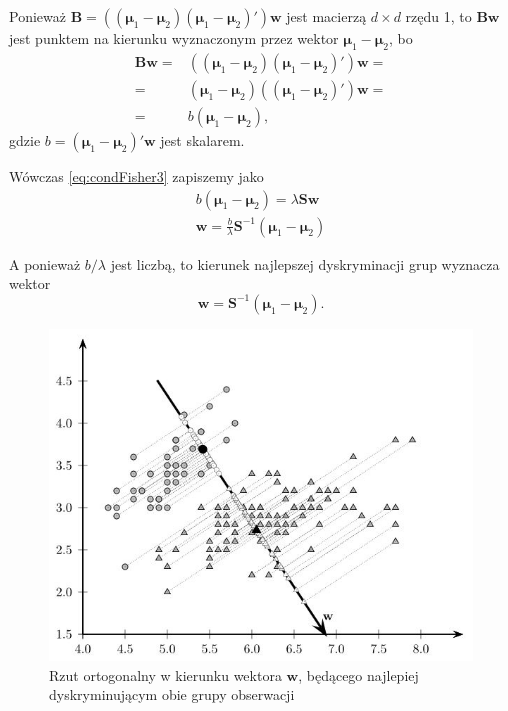 \documentclass[]{book}
\theoremstyle{plain}
\theoremstyle{definition}
\theoremstyle{definition}
\theoremstyle{definition}
\theoremstyle{definition}
\theoremstyle{remark}
\begin{document}
Ponieważ \(\boldsymbol{B}=\left((\boldsymbol{\mu}_1-\boldsymbol{\mu}_2)(\boldsymbol{\mu}_1-\boldsymbol{\mu}_2)'\right)\boldsymbol{w}\) jest macierzą \(d \times d\) rzędu 1, to \(\boldsymbol{B}\boldsymbol{w}\) jest punktem na kierunku wyznaczonym przez wektor \(\boldsymbol{\mu}_1-\boldsymbol{\mu}_2\), bo
\begin{align}
    \boldsymbol{B}\boldsymbol{w}=& \left((\boldsymbol{\mu}_1-\boldsymbol{\mu}_2)(\boldsymbol{\mu}_1-\boldsymbol{\mu}_2)'\right)\boldsymbol{w}=\\
    =&(\boldsymbol{\mu}_1-\boldsymbol{\mu}_2)\left((\boldsymbol{\mu}_1-\boldsymbol{\mu}_2)'\right)\boldsymbol{w}=\\
    =& b(\boldsymbol{\mu}_1-\boldsymbol{\mu}_2),
\end{align}
gdzie \(b = (\boldsymbol{\mu}_1-\boldsymbol{\mu}_2)'\boldsymbol{w}\) jest skalarem.

Wówczas \eqref{eq:condFisher3} zapiszemy jako
\begin{gather}
    b(\boldsymbol{\mu}_1-\boldsymbol{\mu}_2) = \lambda\boldsymbol{S}\boldsymbol{w}\\
    \boldsymbol{w}= \frac{b}{\lambda}\boldsymbol{S}^{-1}(\boldsymbol{\mu}_1-\boldsymbol{\mu}_2)
\end{gather}

A ponieważ \(b/\lambda\) jest liczbą, to kierunek najlepszej dyskryminacji grup wyznacza wektor
\begin{equation}
    \boldsymbol{w}=\boldsymbol{S}^{-1}(\boldsymbol{\mu}_1-\boldsymbol{\mu}_2).
\end{equation}

\begin{figure}

{\centering \includegraphics{images/rzut2} 

}

\caption{Rzut ortogonalny w kierunku wektora $\boldsymbol{w}$, będącego najlepiej dyskryminującym obie grupy obserwacji}\label{fig:rzut2}
\end{figure}
\end{document}
